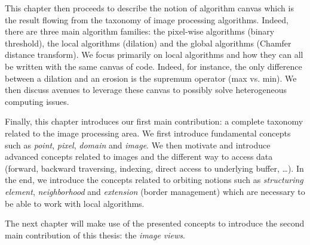 This chapter then proceeds to describe the notion of algorithm canvas which is the result flowing from the taxonomy of
image processing algorithms. Indeed, there are three main algorithm families: the pixel-wise algorithms (binary
threshold), the local algorithms (dilation) and the global algorithms (Chamfer distance transform). We focus primarily
on local algorithms and how they can all be written with the same canvas of code. Indeed, for instance, the only
difference between a dilation and an erosion is the supremum operator (max vs. min). We then discuss avenues to leverage
these canvas to possibly solve heterogeneous computing issues.

Finally, this chapter introduces our first main contribution: a complete taxonomy related to the image processing area.
We first introduce fundamental concepts such as \emph{point}, \emph{pixel}, \emph{domain} and \emph{image}. We then
motivate and introduce advanced concepts related to images and the different way to access data (forward, backward
traversing, indexing, direct access to underlying buffer, \ldots). In the end, we introduce the concepts related to
orbiting notions such as \emph{structuring element}, \emph{neighborhood} and \emph{extension} (border management) which
are necessary to be able to work with local algorithms.

The next chapter will make use of the presented concepts to introduce the second main contribution of this thesis: the
\emph{image views}.
